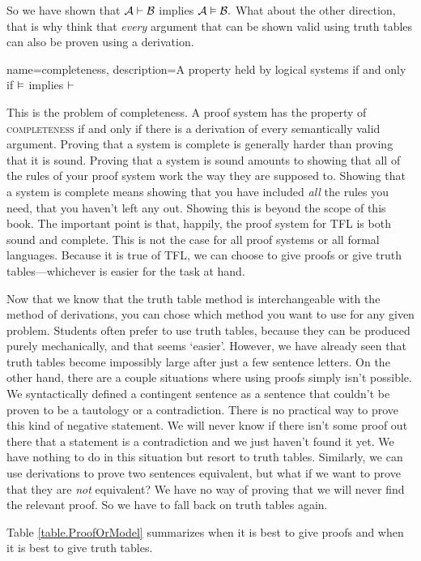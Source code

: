 So we have shown that $\mathcal{A} \vdash  \mathcal{B}$ implies $\mathcal{A} \vDash \mathcal{B}.$ What about the other direction, that is why think that \emph{every} argument that can be shown valid using truth tables can also be proven using a derivation. 

{
name=completeness,
description={A property held by logical systems if and only if $\vDash $ implies $\vdash $}
}

This is the problem of completeness. A proof system has the property of  \textsc{\gls{completeness}} \label{def:completeness} if and only if there is a derivation of every semantically valid argument. Proving that a system is complete is generally harder than proving that it is sound. Proving that a system is sound amounts to showing that all of the rules of your proof system work the way they are supposed to. Showing that a system is complete means showing that you have included \emph{all} the rules you need, that you haven't left any out. Showing this is beyond the scope of this book. The important point is that, happily, the proof system for TFL is both sound and complete. This is not the case for all proof systems or all formal languages. Because it is true of TFL, we can choose to give proofs or give truth tables---whichever is easier for the task at hand.

Now that we know that the truth table method is interchangeable with the method of derivations, you can chose which method you want to use for any given problem. Students often prefer to use truth tables, because they can be produced  purely mechanically, and that seems `easier'. However, we have already seen that truth tables become impossibly large after just a few sentence letters. On the other hand, there are a couple situations where using proofs simply isn't possible. We syntactically defined a contingent sentence as a sentence that couldn't be proven to be a tautology or a contradiction. There is no practical way to prove this kind of negative statement. We will never know if there isn't some proof out there that a statement is a contradiction and we just haven't found it yet. We have nothing to do in this situation but resort to truth tables. Similarly, we can use derivations to prove two sentences equivalent, but what if we want to prove that they are \emph{not} equivalent? We have no way of proving that we will never find the relevant proof. So we have to fall back on truth tables again.

Table \ref{table.ProofOrModel} summarizes when it is best to give proofs and when it is best to give truth tables. 

